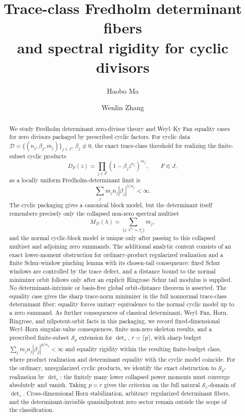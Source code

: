 \documentclass[11pt,a4paper]{amsart}
\title[Trace-Class Fredholm Determinant Fibers]{Trace-class Fredholm determinant fibers\\
and spectral rigidity for cyclic divisors}
\author{Haobo Ma}
\author{Wenlin Zhang}
\date{}
\theoremstyle{plain}
\theoremstyle{definition}
\theoremstyle{remark}
\begin{document}
\begin{abstract}
We study Fredholm determinant zero-divisor theory and Weyl--Ky Fan equality
cases for zero divisors packaged by prescribed cyclic factors.  For cyclic data
\(\mathcal D=\{(n_j,\beta_j,m_j)\}_{j\in J}\), \(\beta_j\ne0\), the exact
trace-class threshold for realizing the finite-subset cyclic products
\[
  D_F(z)=\prod_{j\in F}(1-\beta_jz^{n_j})^{m_j},
  \qquad F\Subset J,
\]
as a locally uniform Fredholm-determinant limit
is
\[
  \sum_j m_jn_j|\beta_j|^{1/n_j}<\infty .
\]
The cyclic packaging gives a canonical block model, but the determinant itself
remembers precisely only the collapsed non-zero
spectral multiset
\[
  M_{\mathcal D}(\lambda)=
  \sum_{\{j:\lambda^{n_j}=\beta_j\}}m_j,
\]
and the normal cyclic-block model is unique only after passing to this
collapsed multiset and adjoining zero summands.  The additional analytic
content consists of an exact lower-moment obstruction for ordinary-product
regularized realization and a finite Schur-window pinching lemma with its
chosen-tail consequence: fixed Schur
windows are controlled by the trace defect, and a distance bound to the normal
minimizer orbit follows only after an explicit Ringrose--Schur tail modulus is
supplied.  No determinant-intrinsic or basis-free global orbit-distance theorem
is asserted.  The equality case gives the sharp trace-norm minimizer in
the full nonnormal trace-class determinant fiber: equality forces unitary
equivalence to the normal cyclic model up to a zero summand.  As further
consequences of classical determinant, Weyl--Fan, Horn, Ringrose, and
nilpotent-orbit facts in this packaging, we record fixed-dimensional
Weyl--Horn singular-value consequences, finite non-zero skeleton results, and a
prescribed finite-subset \(\mathcal S_p\) extension for
\(\det_r\), \(r=\lceil p\rceil\), with sharp budget
\(\sum_jm_jn_j|\beta_j|^{p/n_j}<\infty\) and equality rigidity within the
resulting finite-budget class, where product realization and determinant
equality with the cyclic model coincide.  For the ordinary, unregularized
cyclic products, we identify the exact obstruction to
\(\mathcal S_p\)-realization by \(\det_r\): the finitely many lower collapsed
power moments must converge absolutely and vanish.  Taking \(p=r\) gives the
criterion on the full natural \(\mathcal S_r\)-domain of \(\det_r\).
Cross-dimensional Horn stabilization,
arbitrary regularized determinant fibers, and the determinant-invisible
quasinilpotent zero sector remain outside the scope of the classification.
\end{abstract}
\end{document}

